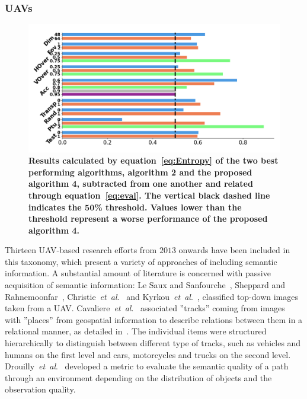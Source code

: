 \documentclass[twocolumn,letterpaper]{IEEEAerospaceCLS}  %
\newcommand{\abbreviation}[1]{\emph{#1}.}
\newcommand{\etal}{\abbreviation{et~al}}
\begin{document}
\subsubsection{UAVs} \label{sssec:ResLitUAV}
\begin{figure}[t]
    \centering
    \includegraphics[width=\textwidth]{Results-13.png}
    \caption{\bf{
        Results calculated by equation~\ref{eq:Entropy} of the two best performing algorithms, algorithm 2 and the proposed algorithm 4, subtracted from one another and related through equation~\ref{eq:eval}. The vertical black dashed line indicates the $\mathbf{50}$\% threshold. Values lower than the threshold represent a worse performance of the proposed algorithm 4.
    }}
    \label{fig:Res}
\end{figure}
Thirteen UAV-based research efforts from $2013$ onwards have been included in this taxonomy, which present a variety of approaches of including semantic information. A substantial amount of literature is concerned with passive acquisition of semantic information: 
Le Saux and Sanfourche~\cite{saux_rapid_2013}, Sheppard and Rahnemoonfar~\cite{sheppard_real-time_2017}, Christie~\etal~\cite{christie_semantics_2016} and Kyrkou~\etal~\cite{kyrkou_dronet:_2018}, classified top-down images taken from a UAV. Cavaliere~\etal~\cite{cavaliere_towards_2016,cavaliere_towards_2018} associated ''tracks'' coming from images with ''places'' from geospatial information to describe relations between them in a relational manner, as detailed in~\cite{landsiedel_review_2017}. The individual items were structured hierarchically to distinguish between different type of tracks, such as vehicles and humans on the first level and cars, motorcycles and trucks on the second level. Drouilly~\etal~\cite{drouilly_semantic_2015} developed a metric to evaluate the semantic quality of a path through an environment depending on the distribution of objects and the observation quality.
\end{document}
